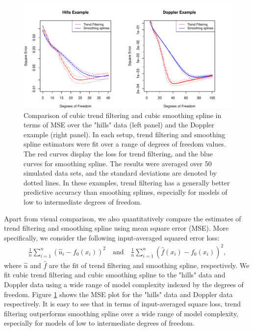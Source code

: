 \documentclass[a4paper]{article}
\begin{document}
\begin{figure}[t!]
\centering
\includegraphics[width = 1.1\textwidth]{Figures/Figure6.pdf}
\caption{Comparison of cubic trend filtering and cubic smoothing spline in terms of MSE over the "hills" data (left panel) and the Doppler example (right panel). In each setup, trend filtering and smoothing spline estimators were fit over a range of degrees of freedom values. The red curves display the loss for trend filtering, and the blue curves for smoothing spline. The results were averaged over 50 simulated data sets, and the standard deviations are denoted by dotted lines. In these examples, trend filtering has a generally better predictive accuracy than smoothing splines, especially for models of low to intermediate degrees of freedom.}
\label{fig:Figure6_mse}
\end{figure}

Apart from visual comparison, we also quantitatively compare the estimates of trend filtering and smoothing spline using mean square error (MSE). More specifically, we consider the following input-averaged squared error loss:
\begin{align*}
\frac{1}{n}\sum_{i=1}^n (\hat{u}_i - f_0(x_i))^2 \quad \text{and}\quad \frac{1}{n}\sum_{i=1}^n (\hat{f}(x_i) - f_0(x_i))^2,
\end{align*}
where $\hat{u}$ and $\hat{f}$ are the fit of trend filtering and smoothing spline, respectively. We fit cubic trend filtering and cubic smoothing spline to the "hills" data and Doppler data using a wide range of model complexity indexed by the degrees of freedom. Figure \ref{fig:Figure6_mse} shows the MSE plot for the "hills" data and Doppler data respectively. It is easy to see that in terms of input-averaged square loss, trend filtering outperforms smoothing spline over a wide range of model complexity, especially for models of low to intermediate degrees of freedom. 
\end{document}
